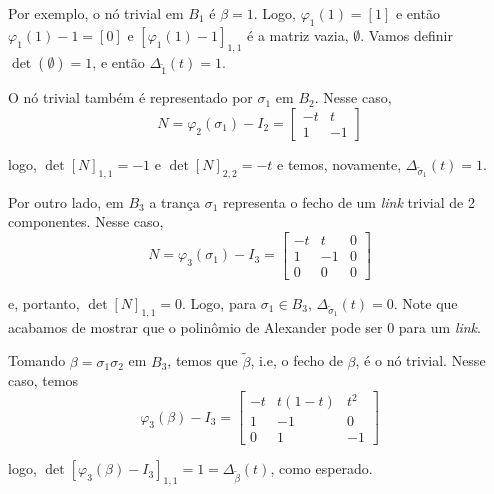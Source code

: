 	\par\vspace{0.3cm} Por exemplo, o nó trivial em $B_1$ é $\beta = 1$. Logo, $\varphi_1(1) = [1]$ e então $\varphi_1(1) - 1 = [0]$ e $[\varphi_1(1) - 1]_{1,1}$ é a matriz vazia, $\emptyset$. Vamos definir $\det(\emptyset) = 1$, e então $\Delta_{\widetilde{1}}(t) = 1$. 
	\par\vspace{0.3cm} O nó trivial também é representado por $\sigma_1$ em $B_2$. Nesse caso, 
	\begin{equation*}
	N = \varphi_2(\sigma_1) - I_2 = \begin{bmatrix}
	-t & t \\
	1 & -1
	\end{bmatrix}
	\end{equation*}
	\par\vspace{0.3cm} logo, $\det[N]_{1,1} = -1$ e $\det[N]_{2,2} = -t$ e temos, novamente, $\Delta_{\widetilde{\sigma}_1}(t) = 1$.
	\par\vspace{0.3cm} Por outro lado, em $B_3$ a trança $\sigma_1$ representa o fecho de um \textit{link} trivial de 2 componentes. Nesse caso, 
	\begin{equation*}
	N = \varphi_3(\sigma_1) - I_3 = \begin{bmatrix}
	-t & t & 0 \\
	1 & -1 & 0 \\
	0 & 0 & 0
	\end{bmatrix}
	\end{equation*}
	\par\vspace{0.3cm} e, portanto, $\det[N]_{1,1} = 0$. Logo, para $\sigma_1\in B_3$, $\Delta_{\widetilde{\sigma}_1}(t) = 0$. Note que acabamos de mostrar que o polinômio de Alexander pode ser $0$ para um \textit{link}.
	\par\vspace{0.3cm} Tomando $\beta = \sigma_1\sigma_2$ em $B_3$, temos que $\widetilde{\beta}$, i.e, o fecho de $\beta$, é o nó trivial. Nesse caso, temos
	\begin{equation*}
	\varphi_3(\beta) - I_3 = \begin{bmatrix}
	-t & t(1-t) & t^2 \\
	1 & -1 & 0 \\
	0 & 1 & -1
	\end{bmatrix}
	\end{equation*}
	\par\vspace{0.3cm} logo, $\det[\varphi_3(\beta)-I_3]_{1,1} = 1 = \Delta_{\widetilde{\beta}}(t)$, como esperado.
